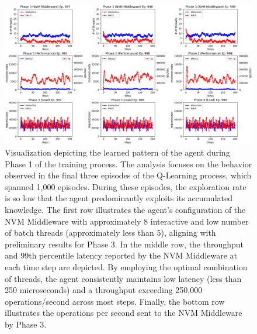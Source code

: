 \begin{figure}[!htb]
  \centering
  \includegraphics[width=\textwidth,height=\textheight,keepaspectratio,angle=0]{images/rl_training_phase3.png}
  \caption[Learned Pattern of Agent during Phase 3]{Visualization depicting the learned pattern of the agent during Phase 1 of the training process. The analysis focuses on the behavior observed in the final three episodes of the Q-Learning process, which spanned 1,000 episodes. During these episodes, the exploration rate is so low that the agent predominantly exploits its accumulated knowledge. The first row illustrates the agent's configuration of the NVM Middleware with approximately 8 interactive and low number of batch threads (approximately less than 5), aligning with preliminary results for Phase 3. In the middle row, the throughput and 99th percentile latency reported by the NVM Middleware at each time step are depicted. By employing the optimal combination of threads, the agent consistently maintains low latency (less than 250 microseconds) and a throughput exceeding 250,000 operations/second across most steps. Finally, the bottom row illustrates the operations per second sent to the NVM Middleware by Phase 3.}
  \label{fig:learned_phase_3}
\end{figure}

